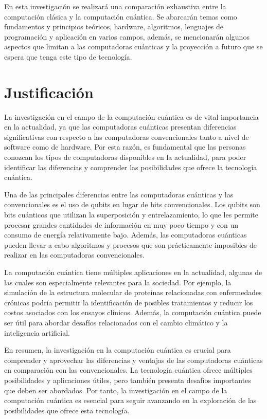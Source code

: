 \documentclass[twoside]{article}
\begin{document}
En esta investigación se realizará una comparación exhaustiva entre la computación clásica y la computación cuántica. Se abarcarán temas como fundamentos y principios teóricos, hardware, algoritmos, lenguajes de programación y aplicación en varios campos, además, se mencionarán algunos aspectos que limitan a las computadoras cuánticas y la proyección a futuro que se espera que tenga este tipo de tecnología.

\newpage 
\section{Justificación}
La investigación en el campo de la computación cuántica es de vital importancia en la actualidad, ya que las computadoras cuánticas presentan diferencias significativas con respecto a las computadoras convencionales tanto a nivel de software como de hardware. Por esta razón, es fundamental que las personas conozcan los tipos de computadoras disponibles en la actualidad, para poder identificar las diferencias y comprender las posibilidades que ofrece la tecnología cuántica. 

Una de las principales diferencias entre las computadoras cuánticas y las convencionales es el uso de qubits en lugar de bits convencionales. Los qubits son bits cuánticos que utilizan la superposición y entrelazamiento, lo que les permite procesar grandes cantidades de información en muy poco tiempo y con un consumo de energía relativamente bajo. Además, las computadoras cuánticas pueden llevar a cabo algoritmos y procesos que son prácticamente imposibles de realizar en las computadoras convencionales. 

La computación cuántica tiene múltiples aplicaciones en la actualidad, algunas de las cuales son especialmente relevantes para la sociedad. Por ejemplo, la simulación de la estructura molecular de proteínas relacionadas con enfermedades crónicas podría permitir la identificación de posibles tratamientos y reducir los costos asociados con los ensayos clínicos. Además, la computación cuántica puede ser útil para abordar desafíos relacionados con el cambio climático y la inteligencia artificial. 

En resumen, la investigación en la computación cuántica es crucial para comprender y aprovechar las diferencias y ventajas de las computadoras cuánticas en comparación con las convencionales. La tecnología cuántica ofrece múltiples posibilidades y aplicaciones útiles, pero también presenta desafíos importantes que deben ser abordados. Por tanto, la investigación en el campo de la computación cuántica es esencial para seguir avanzando en la exploración de las posibilidades que ofrece esta tecnología. 
\end{document}
